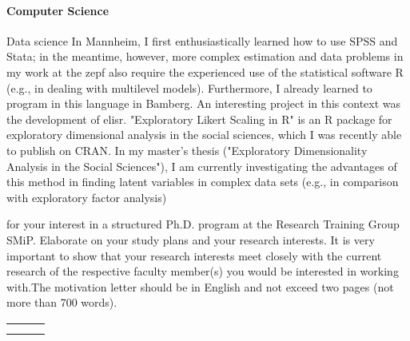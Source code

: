 \documentclass[10pt]{FreemanML}
\begin{document}
\paragraph{Computer Science}

Data science In Mannheim, I first enthusiastically learned how to use SPSS and
Stata; in the meantime, however, more complex estimation and data problems in
my work at the zepf also require the experienced use of the statistical
software R (e.g., in dealing with multilevel models). Furthermore, I already
learned to program in this language in Bamberg. An interesting project in this
context was the development of elisr. "Exploratory Likert Scaling in R" is an
R package for exploratory dimensional analysis in the social sciences, which I
was recently able to publish on CRAN. In my master's thesis ("Exploratory
Dimensionality Analysis in the Social Sciences"), I am currently investigating
the advantages of this method in finding latent variables in complex data sets
(e.g., in comparison with exploratory factor analysis)


for your interest in a structured Ph.D. program at the Research Training Group
SMiP. Elaborate on your study plans and your research interests. It is very
important to show that your research interests meet closely with the current
research of the respective  faculty member(s) you would be interested in
working with.The motivation letter should be in English and not exceed two
pages (not more than 700 words).


\vfill
\begin{tabular}{p{8cm}p{.5cm}l}
\dotfill \\ 
\centering{Steven Bißantz} 
\end{tabular}%
\vfill

\end{document}
